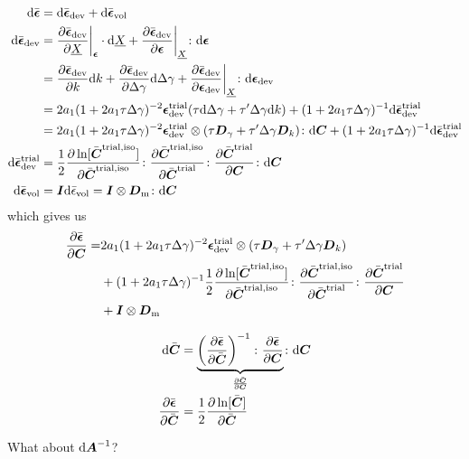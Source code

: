 \documentclass[a4paper,11pt]{article}
\newcommand{\ts}[1]{\text{\boldmath $#1$}}
\newcommand{\pderiv}[2]{\frac{\partial #1}{\partial #2}}
\newcommand{\dev}{{\rm dev}}
\newcommand{\vol}{{\rm vol}}
\newcommand{\iso}{{\rm iso}}
\newcommand{\trial}{{\rm trial}}
\newcommand{\rmd}{{\rm d}}
\newcommand{\rmm}{{\rm m}}
\begin{document}
\begin{align*}
	\rmd\bar{\ts\epsilon} &= \rmd\bar{\ts\epsilon}_\dev + \rmd\bar{\ts\epsilon}_\vol\\
	\rmd\bar{\ts\epsilon}_\dev &= \pderiv{\bar{\ts\epsilon}_\dev}{\underline X}\bigg|_{\ts\epsilon}\cdot\rmd\underline X
		+ \pderiv{\bar{\ts\epsilon}_\dev}{\ts\epsilon}\bigg|_{\underline X}\colon\rmd\ts\epsilon \\
		&= \pderiv{\bar{\ts\epsilon}_\dev}{k}\rmd k +
		\pderiv{\bar{\ts\epsilon}_\dev}{\Delta\gamma}\rmd\Delta\gamma +
		\pderiv{\bar{\ts\epsilon}_\dev}{\ts\epsilon_\dev}\bigg|_{\underline X}\colon\rmd\ts\epsilon_\dev\\
		&= 2 a_1 (1+2 a_1 \tau\Delta\gamma)^{-2}\ts\epsilon_\dev^\trial (\tau\rmd\Delta\gamma + \tau'\Delta\gamma\rmd k) + 
		(1+2 a_1 \tau\Delta\gamma)^{-1}\rmd\bar{\ts\epsilon}_\dev^\trial\\
		&= 2 a_1 (1+2 a_1 \tau\Delta\gamma)^{-2}\ts\epsilon_\dev^\trial\otimes(\tau\ts D_\gamma + \tau'\Delta\gamma\ts D_k)\colon\rmd\ts C + 
		(1+2 a_1 \tau\Delta\gamma)^{-1}\rmd\bar{\ts\epsilon}_\dev^\trial\\
	\rmd\bar{\ts\epsilon}_\dev^\trial &= \frac12\pderiv{\ln[\bar{\ts C}^{\trial,\iso}]}{\bar{\ts C}^{\trial,\iso}}\colon
		\pderiv{\bar{\ts C}^{\trial,\iso}}{\bar{\ts C}^\trial}\colon
		\pderiv{\bar{\ts C}^\trial}{\ts C}\colon\rmd\ts C\\
	\rmd\bar{\ts\epsilon}_\vol &= \ts I\rmd\bar{\epsilon}_\vol = \ts I\otimes \ts D_\rmm \colon \rmd\ts C
\end{align*}
which gives us
\begin{align*}
	\pderiv{\bar{\ts\epsilon}}{\ts C} =& 2 a_1 (1+2 a_1 \tau\Delta\gamma)^{-2}\ts\epsilon_\dev^\trial\otimes(\tau\ts D_\gamma + \tau'\Delta\gamma\ts D_k) \\
		&+(1+2 a_1 \tau\Delta\gamma)^{-1}\frac12\pderiv{\ln[\bar{\ts C}^{\trial,\iso}]}{\bar{\ts C}^{\trial,\iso}}\colon
		\pderiv{\bar{\ts C}^{\trial,\iso}}{\bar{\ts C}^\trial}\colon
		\pderiv{\bar{\ts C}^\trial}{\ts C} \\
		&+ \ts I\otimes \ts D_\rmm
\end{align*}

\begin{align*}
	\rmd\bar{\ts C} &= \underbrace{\left(\pderiv{\bar{\ts\epsilon}}{\bar{\ts C}}\right)^{-1}
		\colon\pderiv{\bar{\ts\epsilon}}{\ts C}}_{\pderiv{\bar{\ts C}}{\ts C}}\colon\rmd\ts C\\
	\pderiv{\bar{\ts\epsilon}}{\bar{\ts C}} &= \frac12\pderiv{\ln[\bar{\ts C}]}{\bar{\ts C}}
\end{align*}

What about $\rmd\ts A^{-1}$?
\end{document}
